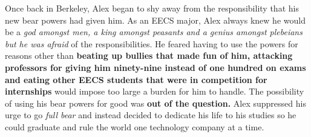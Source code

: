 \documentclass{article}
\begin{document}
Once back in Berkeley, Alex began to shy away from the responsibility that his new bear powers had given him. As an EECS major, Alex always knew he would be a \textit {god amongst \emph {men}, a king amongst \emph {peasants} and a genius amongst \emph {plebeians} but he was afraid} of the responsibilities. He feared having to use the powers for reasons other than \textbf {beating up bullies that made fun of him, attacking professors for giving him ninety-nine instead of one hundred on exams and eating other EECS students that were in competition for internships} would impose too large a burden for him to handle. The possibility of using his bear powers for good was \textbf {out of the question.} Alex suppressed his urge to go \textit {full bear} and instead decided to dedicate his life to his studies so he could graduate and rule the world one technology company at a time. 
\end{document}
